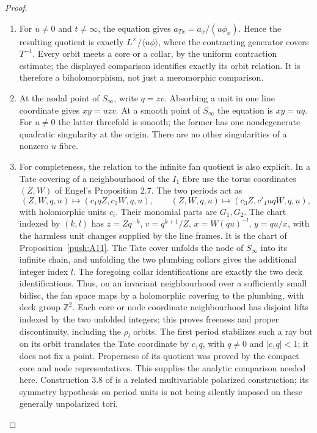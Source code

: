 \begin{proof}
\begin{enumerate}[label=\arabic*.,leftmargin=*]
\item For $u\ne0$ and $t\ne\infty$, the equation gives
$a_{Tx}=a_x/(u\phi_x)$. Hence the resulting quotient is exactly
$L^\times/\langle u\phi\rangle$, where the contracting generator
covers $T^{-1}$. Every orbit meets a core or a collar, by the
uniform contraction estimate; the displayed comparison identifies
exactly its orbit relation. It is therefore a biholomorphism,
not just a meromorphic comparison.

\item At the nodal point of $S_\infty$, write $q=zv$. Absorbing a unit
in one line coordinate gives $xy=uzv$. At a smooth point of
$S_\infty$ the equation is $xy=uq$. For $u\ne0$ the latter
threefold is smooth; the former has one nondegenerate quadratic
singularity at the origin. There are no other singularities of a
nonzero $u$ fibre.

\item For completeness, the relation to the infinite fan quotient is
also explicit. In a Tate covering of a neighbourhood of the $I_1$
fibre use the torus coordinates $(Z,W)$ of Engel's Proposition 2.7.
The two periods act as
\[
 (Z,W,q,u)\longmapsto(c_1qZ,c_2W,q,u),\qquad
 (Z,W,q,u)\longmapsto(c_3Z,c'_4uqW,q,u),
\]
with holomorphic units $c_i$. Their monomial parts are $G_1,G_2$.
The chart indexed by $(k,l)$ has
$z=Zq^{-k}$, $v=q^{k+1}/Z$, $x=W(qu)^{-l}$,
$y=qu/x$, with the harmless unit changes supplied by the line
frames. It is the chart of Proposition~\ref{push:A11}.
The Tate cover unfolds the node of $S_\infty$ into its infinite
chain, and unfolding the two plumbing collars gives the additional
integer index $l$. The foregoing collar identifications are exactly
the two deck identifications. Thus, on an invariant neighbourhood
over a sufficiently small bidisc, the fan space maps by a
holomorphic covering to the plumbing, with deck group $\mathbb Z^2$.
Each core or node coordinate neighbourhood has disjoint lifts
indexed by the two unfolded integers; this proves freeness and
proper discontinuity, including the $\rho_l$ orbits. The first
period stabilizes such a ray but on its orbit translates the Tate
coordinate by $c_1q$, with $q\ne0$ and $|c_1q|<1$; it does not
fix a point. Properness of its quotient was proved by the compact
core and node representatives. This supplies the analytic
comparison needed here. Construction 3.8 of \cite{EGFS25} is a
related multivariable polarized construction; its symmetry
hypothesis on period units is not being silently imposed on these
generally unpolarized tori.


\end{enumerate}
\end{proof}

